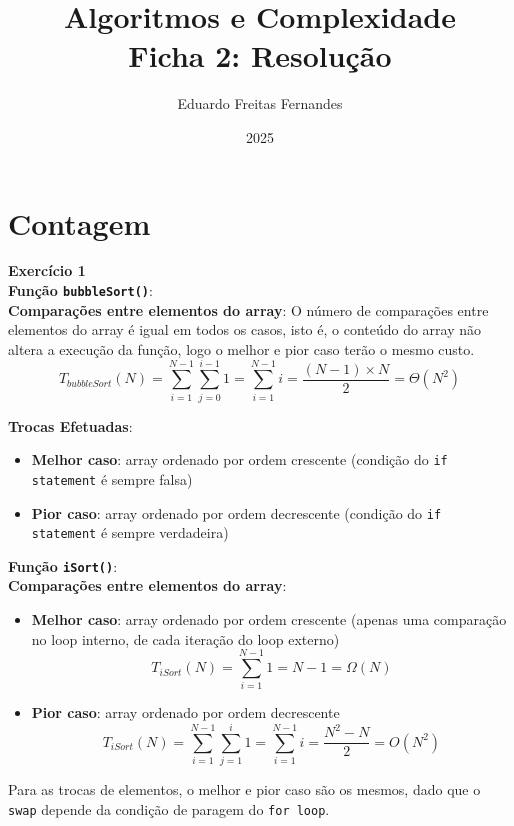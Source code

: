 \documentclass[a4paper,11pt]{article}
\title{Algoritmos e Complexidade\\ Ficha 2: Resolução}
\author{Eduardo Freitas Fernandes}
\date{2025}
\begin{document}
	
	\maketitle
	
	\section{Contagem}
	
	\textbf{Exercício 1}\\
	
	\noindent \textbf{Função \texttt{bubbleSort()}}:\\
	
	\noindent \textbf{Comparações entre elementos do array}:
	O número de comparações entre elementos do array é igual em todos os casos, isto é, o conteúdo do array não altera a execução da função, logo o melhor e pior caso terão o mesmo custo.\\
	\[
		T_{bubbleSort}(N) = \sum_{i=1}^{N-1} \sum_{j=0}^{i-1} 1 = \sum_{i=1}^{N-1} i = \frac{(N-1) \times N}{2} = \Theta(N^2)
	\]
	
	\noindent \textbf{Trocas Efetuadas}:
	\begin{itemize}
		\item \textbf{Melhor caso}: array ordenado por ordem crescente (condição do \texttt{if statement} é sempre falsa)
		\item \textbf{Pior caso}: array ordenado por ordem decrescente (condição do \texttt{if statement} é sempre verdadeira)
	\end{itemize}
	
	\noindent \textbf{Função \texttt{iSort()}}:\\
	
	\noindent \textbf{Comparações entre elementos do array}:
	\begin{itemize}
		\item \textbf{Melhor caso}: array ordenado por ordem crescente (apenas uma comparação no loop interno, de cada iteração do loop externo)
		\[ T_{iSort}(N) = \sum_{i=1}^{N-1} 1 = N-1 = \Omega(N) \]
		\item \textbf{Pior caso}: array ordenado por ordem decrescente
		\[ T_{iSort}(N) = \sum_{i=1}^{N-1} \sum_{j=1}^{i} 1 = \sum_{i=1}^{N-1} i = \frac{N^2 - N}{2} = O(N^2) \]
	\end{itemize}
	
	\noindent Para as trocas de elementos, o melhor e pior caso são os mesmos, dado que o \texttt{swap} depende da condição de paragem do \texttt{for loop}.\\
	
\end{document}
